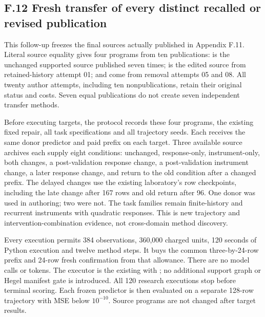 \documentclass[11pt,a4paper]{article}
\begin{document}
\subsection*{F.12 Fresh transfer of every distinct recalled or revised publication}

This follow-up freezes the final sources actually published in Appendix F.11. Literal source equality gives four programs from ten publications:  is the unchanged supported source published seven times;  is the edited source from retained-history attempt 01;  and  come from removal attempts 05 and 08. All twenty author attempts, including ten nonpublications, retain their original status and costs. Seven equal publications do not create seven independent transfer methods.


Before executing targets, the protocol records these four programs, the existing fixed  repair, all task specifications and all trajectory seeds. Each receives the same donor predictor and paid prefix on each target. Three available source archives each supply eight conditions: unchanged, response-only, instrument-only, both changes, a post-validation response change, a post-validation instrument change, a later response change, and return to the old condition after a changed prefix. The delayed changes use the existing laboratory's row checkpoints, including the late change after 167 rows and old return after 96. One donor was used in authoring; two were not. The task families remain finite-history and recurrent instruments with quadratic responses. This is new trajectory and intervention-combination evidence, not cross-domain method discovery.


Every execution permits 384 observations, 360,000 charged units, 120 seconds of Python execution and twelve method steps. It buys the common three-by-24-row prefix and 24-row fresh confirmation from that allowance. There are no model calls or tokens. The executor is the existing  with ; no additional support graph or Hegel manifest gate is introduced. All 120 research executions stop before terminal scoring. Each frozen predictor is then evaluated on a separate 128-row trajectory with MSE below \(10^{-10}\). Source programs are not changed after target results.
\end{document}
